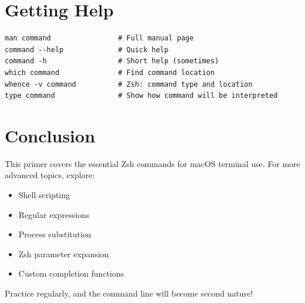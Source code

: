 \documentclass[11pt]{article}
\begin{document}
\section{Getting Help}

\begin{lstlisting}
man command                # Full manual page
command --help             # Quick help
command -h                 # Short help (sometimes)
which command              # Find command location
whence -v command          # Zsh: command type and location
type command               # Show how command will be interpreted
\end{lstlisting}

\section{Conclusion}

This primer covers the essential Zsh commands for macOS terminal use. For more advanced topics, explore:
\begin{itemize}
    \item Shell scripting
    \item Regular expressions
    \item Process substitution
    \item Zsh parameter expansion
    \item Custom completion functions
\end{itemize}

Practice regularly, and the command line will become second nature!
\end{document}
